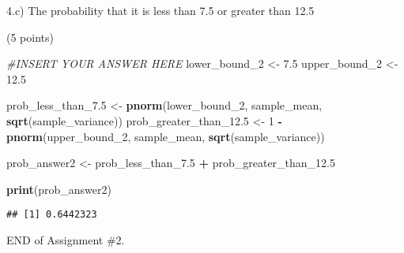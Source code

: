 \documentclass[
]{article}
\newenvironment{Shaded}{\begin{snugshade}}{\end{snugshade}}
\newcommand{\CommentTok}[1]{\textcolor[rgb]{0.56,0.35,0.01}{\textit{#1}}}
\newcommand{\DecValTok}[1]{\textcolor[rgb]{0.00,0.00,0.81}{#1}}
\newcommand{\FloatTok}[1]{\textcolor[rgb]{0.00,0.00,0.81}{#1}}
\newcommand{\FunctionTok}[1]{\textcolor[rgb]{0.13,0.29,0.53}{\textbf{#1}}}
\newcommand{\NormalTok}[1]{#1}
\newcommand{\OtherTok}[1]{\textcolor[rgb]{0.56,0.35,0.01}{#1}}
\newcommand{\SpecialCharTok}[1]{\textcolor[rgb]{0.81,0.36,0.00}{\textbf{#1}}}
\begin{document}
4.c) The probability that it is less than 7.5 or greater than 12.5

(5 points)

\begin{Shaded}
\begin{Highlighting}[]
\CommentTok{\#INSERT YOUR ANSWER HERE}
\NormalTok{lower\_bound\_2 }\OtherTok{\textless{}{-}} \FloatTok{7.5}
\NormalTok{upper\_bound\_2 }\OtherTok{\textless{}{-}} \FloatTok{12.5}

\NormalTok{prob\_less\_than\_7}\FloatTok{.5} \OtherTok{\textless{}{-}} \FunctionTok{pnorm}\NormalTok{(lower\_bound\_2, sample\_mean, }\FunctionTok{sqrt}\NormalTok{(sample\_variance))}
\NormalTok{prob\_greater\_than\_12}\FloatTok{.5} \OtherTok{\textless{}{-}} \DecValTok{1} \SpecialCharTok{{-}} \FunctionTok{pnorm}\NormalTok{(upper\_bound\_2, sample\_mean, }\FunctionTok{sqrt}\NormalTok{(sample\_variance))}

\NormalTok{prob\_answer2 }\OtherTok{\textless{}{-}}\NormalTok{ prob\_less\_than\_7}\FloatTok{.5} \SpecialCharTok{+}\NormalTok{ prob\_greater\_than\_12}\FloatTok{.5}

\FunctionTok{print}\NormalTok{(prob\_answer2)}
\end{Highlighting}
\end{Shaded}

\begin{verbatim}
## [1] 0.6442323
\end{verbatim}

END of Assignment \#2.
\end{document}
